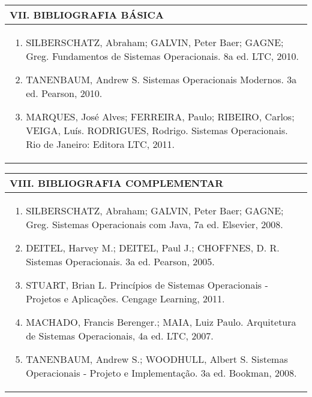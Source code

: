 \documentclass[12pt]{article}
\begin{document}
\begin{longtable}{|L{1.025\textwidth}|} \hline
%
{\bf VII. BIBLIOGRAFIA BÁSICA} \\ \hline

\begin{enumerate}
\item  SILBERSCHATZ, Abraham; GALVIN, Peter Baer; GAGNE; Greg. Fundamentos de Sistemas Operacionais. 8a ed. LTC, 2010. 
\item TANENBAUM, Andrew S. Sistemas Operacionais Modernos. 3a ed. Pearson, 2010. 
\item MARQUES, José Alves; FERREIRA, Paulo; RIBEIRO, Carlos; VEIGA, Luís. RODRIGUES, Rodrigo. Sistemas Operacionais. Rio de Janeiro: Editora LTC, 2011.

\end{enumerate}
 \\ \hline
\end{longtable}



\begin{longtable}{|L{1.025\textwidth}|} \hline
%
{\bf VIII. BIBLIOGRAFIA COMPLEMENTAR} \\ \hline
\begin{enumerate}
\item SILBERSCHATZ, Abraham; GALVIN, Peter Baer; GAGNE; Greg. Sistemas Operacionais com Java, 7a ed. Elsevier, 2008. 
\item DEITEL, Harvey M.; DEITEL, Paul J.; CHOFFNES, D. R. Sistemas Operacionais. 3a ed. Pearson, 2005. 
\item STUART, Brian L. Princípios de Sistemas Operacionais - Projetos e Aplicações. Cengage Learning, 2011. 
\item MACHADO, Francis Berenger.; MAIA, Luiz Paulo. Arquitetura de Sistemas Operacionais, 4a ed. LTC, 2007. 
\item  TANENBAUM, Andrew S.; WOODHULL, Albert S. Sistemas Operacionais - Projeto e Implementação. 3a ed. Bookman, 2008.



\end{enumerate}
 \\ \hline
\end{longtable}




\end{document}
